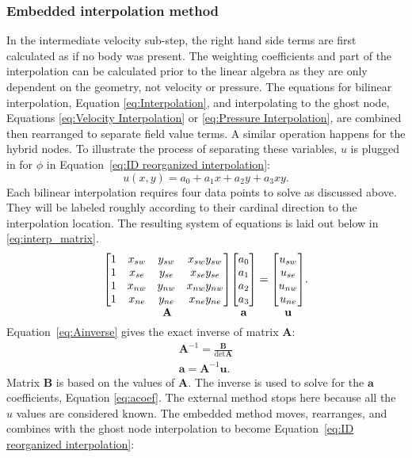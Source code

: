 \documentclass[preprint,12pt]{elsarticle}
\newcommand*{\putunder}[2]{%
	{\mathop{#1}_{\textstyle #2}}%
}
\begin{document}
\subsubsection{Embedded interpolation method}
\label{sec:ID embedded}
In the intermediate velocity sub-step, the right hand side terms are first calculated as if no body was present.
The weighting coefficients and part of the interpolation can be calculated prior to the linear algebra as they are only dependent on the geometry, not velocity or pressure.
The equations for bilinear interpolation, Equation \eqref{eq:Interpolation}, and interpolating to the ghost node, Equations \eqref{eq:Velocity Interpolation} or \eqref{eq:Pressure Interpolation}, are combined then rearranged to separate field value terms.
A similar operation happens for the hybrid nodes.
To illustrate the process of separating these variables, $u$ is plugged in for $\phi$ in Equation~\eqref{eq:ID reorganized interpolation}:
\begin{equation}
u(x,y) = a_0 + a_1x +a_2y+a_3xy.
\end{equation}
Each bilinear interpolation requires four data points to solve as discussed above.
They will be labeled roughly according to their cardinal direction to the interpolation location.
The resulting system of equations is laid out below in \eqref{eq:interp_matrix}.
\begin{gather}
\putunder{
	\begin{bmatrix}
	1&x_{sw}&y_{sw}&x_{sw}y_{sw}\\
	1&x_{se}&y_{se}&x_{se}y_{se}\\
	1&x_{nw}&y_{nw}&x_{nw}y_{nw}\\
	1&x_{ne}&y_{ne}&x_{ne}y_{ne}
	\end{bmatrix}
}{\textbf{A}}
\putunder{
	\begin{bmatrix}
	a_0\\
	a_1\\
	a_2\\
	a_3
	\end{bmatrix}
}{\textbf{a}\vphantom{A}}
=
\putunder{
	\begin{bmatrix}
	u_{sw}\\
	u_{se}\\
	u_{nw}\\
	u_{ne}
	\end{bmatrix}
}{\textbf{u}\vphantom{A}}.
\label{eq:interp_matrix}
\end{gather}
Equation~\eqref{eq:Ainverse} gives the exact inverse of matrix $\textbf{A}$:
\begin{align}
\textbf{A}^{-1} = \frac{\textbf{B}}{\det{\textbf{A}}}
\label{eq:Ainverse}\\
\textbf{a}=\textbf{A}^{-1}\textbf{u}.\;\label{eq:acoef}
\end{align}
Matrix $\textbf{B}$ is based on the values of $\textbf{A}$.
The inverse is used to solve for the $\textbf{a}$ coefficients, Equation \eqref{eq:acoef}.
The external method stops here because all the $u$ values are considered known.
The embedded method moves, rearranges, and combines with the ghost node interpolation to become Equation~\eqref{eq:ID reorganized interpolation}:
\end{document}
